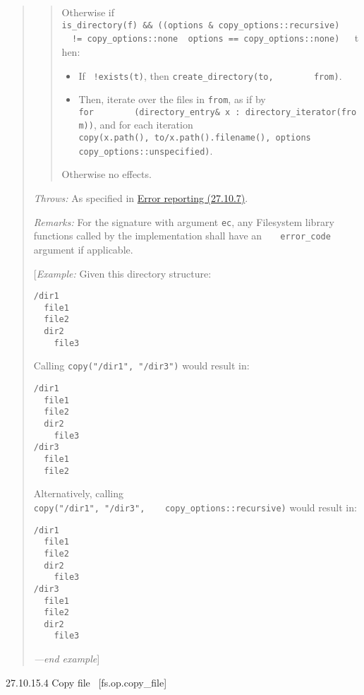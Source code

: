 \begin{quote}
\begin{quote}
Otherwise if
\texttt{is\_directory(f)\ \&\&\ ((options\ \&\ copy\_options::recursive)\ ~\ \ \ \ !=\ copy\_options::none\ \textbar{}\textbar{}\ options\ ==\ copy\_options::none)\ \ \ }then:

\begin{itemize}
\tightlist
\item
  If~ \texttt{!exists(t)}, then
  \texttt{create\_directory(to,\ \ \ \ \ \ \ \ from)}.
\item
  Then, iterate over the files in \texttt{from}, as if by
  \texttt{for\ \ \ \ \ \ \ \ (directory\_entry\&\ x\ :\ directory\_iterator(from))},
  and for each iteration
  \texttt{copy(x.path(),\ to/x.path().filename(),\ options\ \textbar{}\ \ \ \ \ \ \ \ copy\_options::unspecified)}.
\end{itemize}

Otherwise no effects.
\end{quote}

\emph{Throws:} As specified in \hyperref[Error-reporting]{Error
reporting (27.10.7)}.

\emph{Remarks:} For the signature with argument \texttt{ec}, any
Filesystem library functions called by the implementation shall have an
\texttt{\ \ \ error\_code} argument if applicable.

{[}\emph{Example:} Given this directory structure:

\begin{verbatim}
/dir1
  file1
  file2
  dir2
    file3
\end{verbatim}

Calling \texttt{copy("/dir1",\ "/dir3")} would result in:

\begin{verbatim}
/dir1
  file1
  file2
  dir2
    file3
/dir3
  file1
  file2
\end{verbatim}

Alternatively, calling
\texttt{copy("/dir1",\ "/dir3",\ \ \ \ copy\_options::recursive)} would
result in:

\begin{verbatim}
/dir1
  file1
  file2
  dir2
    file3  
/dir3
  file1
  file2
  dir2
    file3
\end{verbatim}

\emph{---end example}{]}
\end{quote}

27.10.15.4 Copy file~ {[}fs.op.copy\_file{]}

